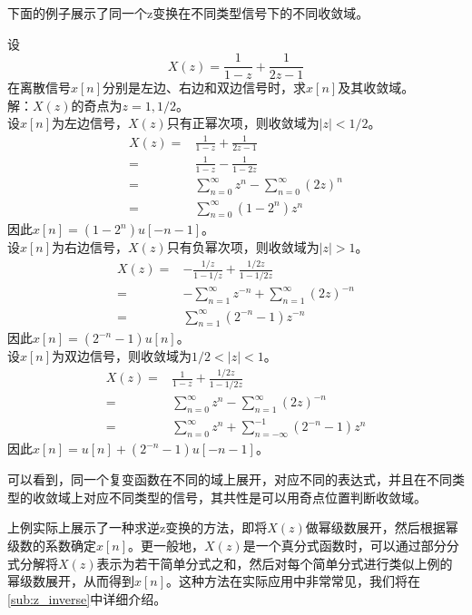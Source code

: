 下面的例子展示了同一个z变换在不同类型信号下的不同收敛域。
\begin{example}[收敛域的确定]
    设$$X(z)=\frac{1}{1-z}+\frac{1}{2z-1}$$
    在离散信号$x[n]$分别是左边、右边和双边信号时，求$x[n]$及其收敛域。\\
    解：$X(z)$的奇点为$z=1,1/2$。\\
    设$x[n]$为左边信号，$X(z)$只有正幂次项，则收敛域为$|z|<1/2$。
    \begin{align*}
        X(z)=&\frac{1}{1-z}+\frac{1}{2z-1}\\
        =&\frac{1}{1-z}-\frac{1}{1-2z}\\
        =&\sum_{n=0}^{\infty}z^{n}-\sum_{n=0}^{\infty}\left(2z\right)^{n}\\
        =&\sum_{n=0}^{\infty}\left(1-2^{n}\right)z^{n}
    \end{align*}
    因此$x[n]=(1-2^{n})u[-n-1]$。\\
    设$x[n]$为右边信号，$X(z)$只有负幂次项，则收敛域为$|z|>1$。
    \begin{align*}
        X(z)=&-\frac{1/z}{1-1/z}+\frac{1/2z}{1-1/2z}\\
        =&-\sum_{n=1}^{\infty}z^{-n}+\sum_{n=1}^{\infty}\left(2z\right)^{-n}\\
        =&\sum_{n=1}^{\infty}\left(2^{-n}-1\right)z^{-n}
    \end{align*}
    因此$x[n]=(2^{-n}-1)u[n]$。\\
    设$x[n]$为双边信号，则收敛域为$1/2<|z|<1$。 
    \begin{align*}
        X(z)=&\frac{1}{1-z}+\frac{1/2z}{1-1/2z}\\
        =&\sum_{n=0}^{\infty}z^{n}-\sum_{n=1}^{\infty}\left(2z\right)^{-n}\\
        =&\sum_{n=0}^{\infty}z^{n}+\sum_{n=-\infty}^{-1}\left(2^{-n}-1\right)z^{n}
    \end{align*}
    因此$x[n]=u[n]+(2^{-n}-1)u[-n-1]$。
\end{example}
可以看到，同一个复变函数在不同的域上展开，对应不同的表达式，并且在不同类型的收敛域上对应不同类型的信号，其共性是可以用奇点位置判断收敛域。

上例实际上展示了一种求逆z变换的方法，即将$X(z)$做幂级数展开，然后根据幂级数的系数确定$x[n]$。更一般地，$X(z)$是一个真分式函数时，可以通过部分分式分解将$X(z)$表示为若干简单分式之和，然后对每个简单分式进行类似上例的幂级数展开，从而得到$x[n]$。这种方法在实际应用中非常常见，我们将在\ref{sub:z_inverse}中详细介绍。

